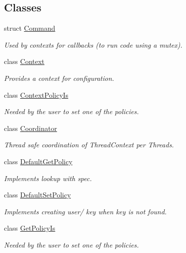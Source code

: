 \subsection*{Classes}
\begin{DoxyCompactItemize}
\item 
struct \mbox{\hyperlink{structkdb_1_1Command}{Command}}
\begin{DoxyCompactList}\small\item\em Used by contexts for callbacks (to run code using a mutex). \end{DoxyCompactList}\item 
class \mbox{\hyperlink{classkdb_1_1Context}{Context}}
\begin{DoxyCompactList}\small\item\em Provides a context for configuration. \end{DoxyCompactList}\item 
class \mbox{\hyperlink{classkdb_1_1ContextPolicyIs}{Context\+Policy\+Is}}
\begin{DoxyCompactList}\small\item\em Needed by the user to set one of the policies. \end{DoxyCompactList}\item 
class \mbox{\hyperlink{classkdb_1_1Coordinator}{Coordinator}}
\begin{DoxyCompactList}\small\item\em Thread safe coordination of Thread\+Context per Threads. \end{DoxyCompactList}\item 
class \mbox{\hyperlink{classkdb_1_1DefaultGetPolicy}{Default\+Get\+Policy}}
\begin{DoxyCompactList}\small\item\em Implements lookup with spec. \end{DoxyCompactList}\item 
class \mbox{\hyperlink{classkdb_1_1DefaultSetPolicy}{Default\+Set\+Policy}}
\begin{DoxyCompactList}\small\item\em Implements creating user/ key when key is not found. \end{DoxyCompactList}\item 
class \mbox{\hyperlink{classkdb_1_1GetPolicyIs}{Get\+Policy\+Is}}
\begin{DoxyCompactList}\small\item\em Needed by the user to set one of the policies. \end{DoxyCompactList}\item 

\end{DoxyCompactItemize}
